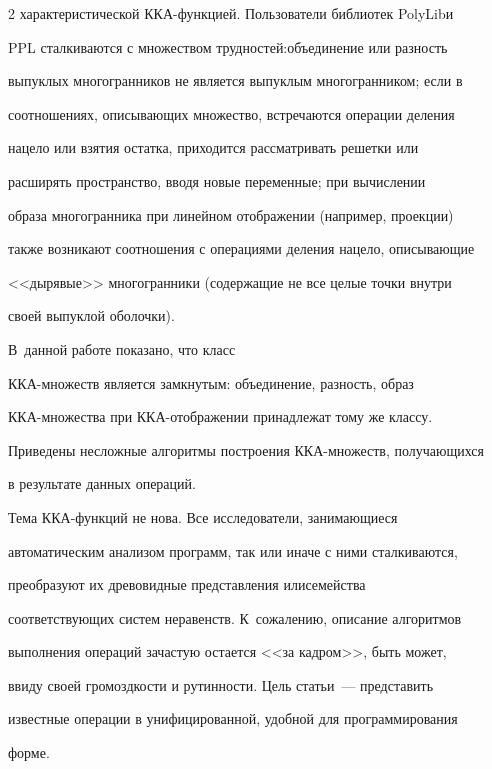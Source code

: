 \begin{multicols}{2}
характеристической ККА-функ\-ци\-ей. Пользователи библиотек PolyLib\linebreak и

PPL сталкиваются с множеством трудностей:\linebreak объединение или разность

выпуклых многогранников не является выпуклым многогранником; если в

соотношениях, описывающих множество, встречаются операции деления

нацело или взятия остатка, приходится рассматривать решетки или

расширять пространство, вводя новые переменные; при вы\-чис\-ле\-нии

образа многогранника при линейном отображении (например, проекции)

также возникают соотношения с операциями деления нацело, описывающие

<<дырявые>> многогранники (содержащие не все целые точки внутри

своей выпуклой оболочки). 



В~данной работе показано, что класс

ККА-мно\-жеств является замкнутым: объединение, разность, образ

ККА-мно\-же\-ст\-ва при ККА-отобра\-же\-нии принадлежат тому же классу.

Приведены несложные алгоритмы построения ККА-мно\-жеств, получающихся

в результате данных операций.



Тема ККА-функций не нова. Все исследователи,  занимающиеся

автоматическим анализом программ, так или иначе с ними сталкиваются,

преобразуют их древовидные представления или\linebreak семейства

соответствующих систем неравенств. К~сожалению, описание алгоритмов

выполнения операций зачастую остается <<за кадром>>, быть может,

ввиду своей громоздкости и рутинности. Цель \mbox{статьи}~--- представить

известные операции в унифицированной, удобной для программирования\linebreak

форме.




\end{multicols}
